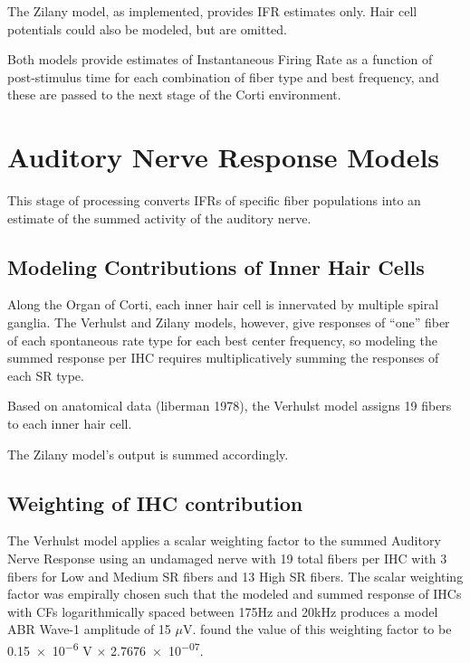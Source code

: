The Zilany model, as implemented, provides IFR estimates only.  Hair cell potentials could also be modeled, but are omitted.

Both models provide estimates of Instantaneous Firing Rate as a function of post-stimulus time for each combination of fiber type and best frequency, and these are passed to the next stage of the Corti environment.


\section{Auditory Nerve Response Models} %
\label{sec:auditory_nerve_response_models}
This stage of processing converts IFRs of specific fiber populations into an estimate of the summed activity of the auditory nerve. 

\subsection{Modeling Contributions of Inner Hair Cells} %
\label{sub:contributions_to_the_response_by_inner_hair_cells}
Along the Organ of Corti, each inner hair cell is innervated by multiple spiral ganglia.  The Verhulst and Zilany models, however, give responses of ``one'' fiber of each spontaneous rate type for each best center frequency, so modeling the summed response per IHC requires multiplicatively summing the responses of each SR type. 

Based on anatomical data (liberman 1978), the Verhulst model assigns 19 fibers to each inner hair cell.  

The Zilany model's output is summed accordingly. 
\subsection{Weighting of IHC contribution} %
\label{sub:weighting_of_ihc_contribution}
The Verhulst model applies a scalar weighting factor to the summed Auditory Nerve Response using an undamaged nerve with 19 total fibers per IHC with 3 fibers for Low and Medium SR fibers and 13 High SR fibers. The scalar weighting factor was empirally chosen such that the modeled and summed response of IHCs with CFs logarithmically spaced between 175Hz and 20kHz produces a model ABR Wave-1 amplitude of 15 $\mu$V.  \citeauthor{Verhulst2015Functional} found the value of this weighting factor to be \num{0.15e-6} V $\times$ \num{2.7676e-07}.

